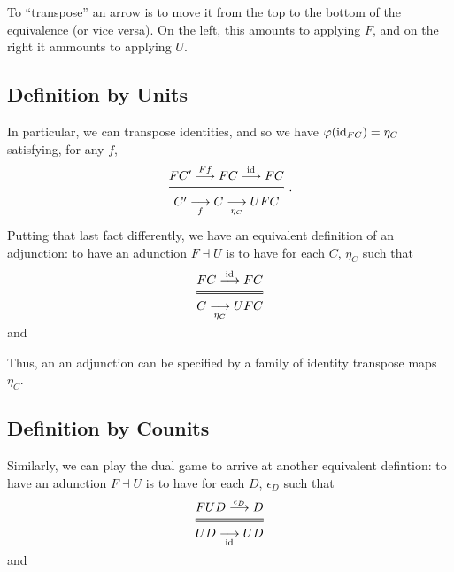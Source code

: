 \begin{remark}
	To ``transpose'' an arrow is to move it from the top to the bottom of the equivalence (or vice versa). On the left, this amounts to applying $F$, and on the right it ammounts to applying $U$.
\end{remark}

\subsection{Definition by Units}

In particular, we can transpose identities, and so we have $\varphi(\mathrm{id}_{ FC }) = \eta_C$ satisfying, for any $f$,
\begin{equation*}
  \Efrac{FC' \overset{F f}\longrightarrow FC \overset{\id{}}\longrightarrow FC}
  {C' \underset{f}\longrightarrow C \underset{\eta_C}\longrightarrow UFC}\;.
\end{equation*} 



\begin{definition}
Putting that last fact differently, we have an equivalent definition of an
adjunction: to have an adunction $F \dashv U$ is to have for each $C$, $\eta_C$ such that
\begin{equation*}
  \Efrac{FC \overset{\id{}}\longrightarrow FC}
  {C \underset{\eta_C}\longrightarrow UFC}
\end{equation*} 
and
\begin{center}
\end{center}
\end{definition}

Thus, an an adjunction can be specified by a family of identity transpose maps $\eta_C$.

\subsection{Definition by Counits}
\begin{definition}
Similarly, we can play the dual game to arrive at another equivalent defintion:
to have an adunction $F \dashv U$ is to have for each $D$, $\epsilon_D$ such that
\begin{equation*}
  \Efrac{FUD \overset{\epsilon_D}\longrightarrow D}
  {UD \underset{\id{}}\longrightarrow UD}
\end{equation*} 
and
\begin{center}
\end{center}
\end{definition}

